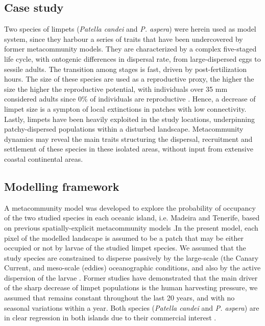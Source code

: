 \documentclass[12pt]{article}
\begin{document}
\begin{justify}
{{{{{\subsection{Case study}
Two species of limpets (\textit{Patella candei} and \textit{P. aspera}) were herein used as model system, since they harbour a series of traits that have been undercovered by former metacommunity models. They are characterized by a complex five-staged life cycle, with ontogenic differences in dispersal rate, from large-dispersed eggs to sessile adults. The transition among stages is fast, driven by post-fertilization hours. The size of these species are used as a reproductive proxy, the higher the size the higher the reproductive potential, with individuals over 35 mm considered adults since 0\% of individuals are reproductive \citep{henriques2012life}. Hence, a decrease of limpet size is a sympton of local extinctions in patches with low connectivity. Lastly, limpets have been heavily exploited in the study locations, underpinning patchy-dispersed populations within a disturbed landscape. Metacommunity dynamics may reveal the main traits structuring the dispersal, recruitment and settlement of these species in these isolated areas, without input from extensive coastal continental areas.

\subsection{Modelling framework}
A metacommunity model was developed to explore the probability of occupancy of the two studied species in each oceanic island, i.e. Madeira and Tenerife, based on previous spatially-explicit metacommunity models \citep{hanski1999habitat,hanski2000metapopulation, ovaskainen2001spatially, hanski2002extinction, bertuzzo2015metapopulation}.In the present model, each pixel of the modelled landscape is assumed to be a patch that may be either occupied or not by larvae of the studied limpet species. We assumed that the study species are constrained to disperse passively by the large-scale (the Canary Current, \citep{barton1998transition} and meso-scale (eddies) oceanographic conditions, and also by the active dispersion of the larvae \citep{henriques2012life}. Former studies have demonstrated that the main driver of the sharp decrease of limpet populations is the human harvesting pressure, we assumed that remains constant throughout the last 20 years, and with no seasonal variations within a year. Both species (\textit{Patella candei} and \textit{P. aspera}) are in clear regression in both islands due to their commercial interest \citep{riera2016clear, sousa2019long}.

}}}}}
\end{justify}
\end{document}
